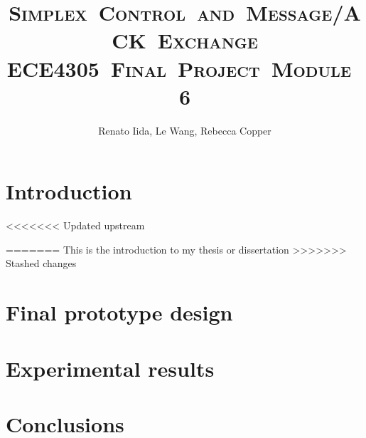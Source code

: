 \documentclass[11pt]{mvlthesis}
\title{\scshape \mbox{Simplex Control and Message/ACK Exchange}\\
\scshape \mbox{ECE4305 Final Project Module 6}}
\author{Renato Iida, Le Wang, Rebecca Copper}
\begin{document}
\maketitle
\begin{abstract}



\end{abstract}


\begin{frontmatter}

\begin{acknowledgements}
\end{acknowledgements}
\tableofcontents
\listoffigures
\listoftables

\end{frontmatter}



\chapter{Introduction}
\label{ch:introduction}

<<<<<<< Updated upstream

=======
This is the introduction to my thesis or dissertation
>>>>>>> Stashed changes

\chapter{Final prototype design}
\label{ch:design}


\chapter{Experimental results}
\label{ch:results}



\chapter{Conclusions}
\label{ch:conclusions}



\end{document}
